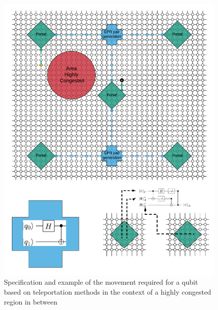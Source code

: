 \documentclass[11pt]{article}
\begin{document}
\begin{figure}[htbp]
\centering
\includegraphics[width=\textwidth]{Teletransmission2.png}
\caption{\label{fig:org167b470}
Specification and example of the movement required for a qubit based on teleportation methods in the context of a highly congested region in between}
\end{figure}
\end{document}
